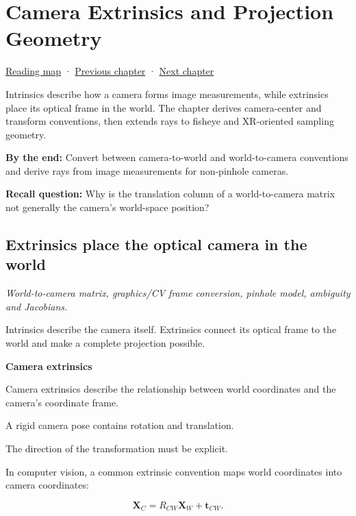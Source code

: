 \chapter{Camera Extrinsics and Projection Geometry}\label{02-foundations-ii-ch035-camera-extrinsics-and-projection-geometry}\hypertarget{02-foundations-ii-ch035}{}\label{stagechapter:02-foundations-ii-ch035}

\hyperref[volume-reading-map]{Reading map} · \hyperref[02-foundations-ii-ch034-robust-predicates-and-camera-sensitivity]{Previous chapter} · \hyperref[02-foundations-ii-ch036-exposure-physical-optics-and-depth-of-field]{Next chapter}

Intrinsics describe how a camera forms image measurements, while extrinsics place its optical frame in the world. The chapter derives camera-center and transform conventions, then extends rays to fisheye and XR-oriented sampling geometry.

\textbf{By the end:} Convert between camera-to-world and world-to-camera conventions and derive rays from image measurements for non-pinhole cameras.

\textbf{Recall question:} Why is the translation column of a world-to-camera matrix not generally the camera's world-space position?

\section{Extrinsics place the optical camera in the world}\label{02-foundations-ii-ch035-extrinsics-place-the-optical-camera-in-the-world}

\emph{World-to-camera matrix, graphics/CV frame conversion, pinhole model, ambiguity and Jacobians.}

Intrinsics describe the camera itself. Extrinsics connect its optical frame to the world and make a complete projection possible.

\textbf{Camera extrinsics}

Camera extrinsics describe the relationship between world coordinates and the camera's coordinate frame.

A rigid camera pose contains rotation and translation.

The direction of the transformation must be explicit.

In computer vision, a common extrinsic convention maps world coordinates into camera coordinates:

\[
 \boxed{ \mathbf X_C=R_{CW}\mathbf X_W+\mathbf t_{CW} }.
\]


